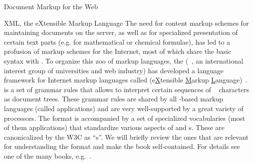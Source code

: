\begin{tchapter}[id=markup-web]{Document Markup for the Web}
\begin{tsection}[id=xml]{XML, the eXtensible Markup Language}
  The need for content markup schemes for maintaining documents on the server, as well as
  for specialized presentation of certain text parts (e.g. for mathematical or chemical
  formulae), has led to a profusion of markup schemes for the Internet, most of which
  share the basic {\sgml} syntax with {\html}.  To organize this zoo of markup languages,
  the {} ({}~\cite{URL:w3c}, an
  international interest group of universities and web industry) has developed a language
  framework for Internet markup languages called {\xml} (e{\underline{X}}tensible
  {\underline{M}}arkup {\underline{L}}anguage)~\cite{Bray:XML97}. {\xml} is a set of
  grammar rules that allows to interpret certain sequences of
  {}~\cite{Unicode:tuc03} characters as document trees. These grammar
  rules are shared by all {\xml}-based markup languages (called {\xml}
  applications) and are very well-supported by a great
  variety of {\xml} processors. The {\xml} format is
  accompanied by a set of specialized vocabularies (most of them {\xml} applications) that
  standardize various aspects of {} and
  {s}. These are canonicalized by the W3C as
  ``{s}''. We will briefly review the ones that are relevant for
  understanding the {\omdoc} format and make the book self-contained. For details see one
  of the many {\xml} books, e.g.~\cite{Harold:xb01}.


\end{tsection}
\end{tchapter}
